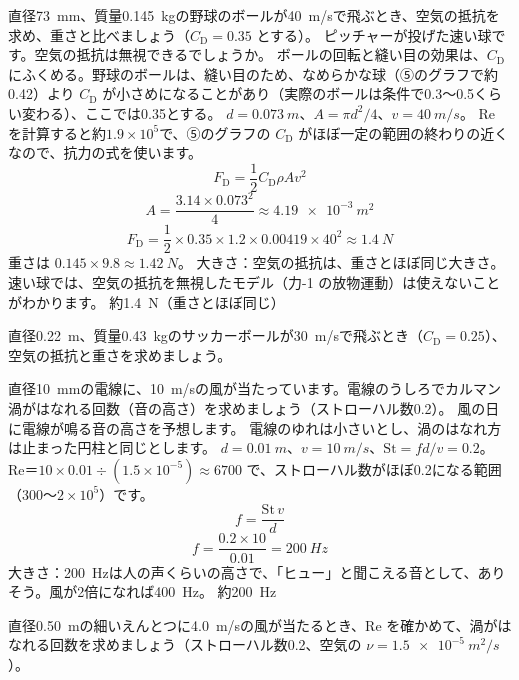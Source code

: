 \begin{phreidai}[野球のボールにはたらく空気の抵抗]\label{ph:力-15:ex7}
直径\qty{73}{mm}、質量\qty{0.145}{kg}の野球のボールが\qty{40}{m/s}で飛ぶとき、空気の抵抗を求め、重さと比べましょう（$C_{\mathrm D}=0.35$ とする）。
\phbamen
ピッチャーが投げた速い球です。空気の抵抗は無視できるでしょうか。
\phmushi
ボールの回転と縫い目の効果は、$C_{\mathrm D}$ にふくめる。野球のボールは、縫い目のため、なめらかな球（⑤のグラフで約0.42）より $C_{\mathrm D}$ が小さめになることがあり（実際のボールは条件で0.3〜0.5くらい変わる）、ここでは0.35とする。
\phzu
$d=\qty{0.073}{m}$、$A=\pi d^2/4$、$v=\qty{40}{m/s}$。
\phriyu
Re を計算すると約$1.9\times10^5$で、⑤のグラフの $C_{\mathrm D}$ がほぼ一定の範囲の終わりの近くなので、抗力の式を使います。
\phtateru
\[F_{\mathrm D}=\frac{1}{2}C_{\mathrm D}\rho Av^2\]
\phtoku
\[A=\frac{3.14\times0.073^2}{4}\approx\qty{4.19e-3}{m^2}\]
\[F_{\mathrm D}=\frac12\times0.35\times1.2\times0.00419\times40^2\approx\qty{1.4}{N}\]
重さは $0.145\times9.8\approx\qty{1.42}{N}$。
\phtashikame
大きさ：空気の抵抗は、重さとほぼ同じ大きさ。速い球では、空気の抵抗を無視したモデル（力-1 の放物運動）は使えないことがわかります。
\kotae 約\qty{1.4}{N}（重さとほぼ同じ）
\end{phreidai}
\begin{jibun}
直径\qty{0.22}{m}、質量\qty{0.43}{kg}のサッカーボールが\qty{30}{m/s}で飛ぶとき（$C_{\mathrm D}=0.25$）、空気の抵抗と重さを求めましょう。
\end{jibun}

\begin{phreidai}[電線が鳴る音の高さ]\label{ph:力-15:ex8}
直径\qty{10}{mm}の電線に、\qty{10}{m/s}の風が当たっています。電線のうしろでカルマン渦がはなれる回数（音の高さ）を求めましょう（ストローハル数0.2）。
\phbamen
風の日に電線が鳴る音の高さを予想します。
\phmushi
電線のゆれは小さいとし、渦のはなれ方は止まった円柱と同じとします。
\phzu
$d=\qty{0.01}{m}$、$v=\qty{10}{m/s}$、$\mathrm{St}=fd/v=0.2$。
\phriyu
Re＝$10\times0.01\div (1.5\times10^{-5})\approx\num{6700}$ で、ストローハル数がほぼ0.2になる範囲（300〜$2\times10^5$）です。
\phtateru
\[f=\frac{\mathrm{St}\,v}{d}\]
\phtoku
\[f=\frac{0.2\times10}{0.01}=\qty{200}{Hz}\]
\phtashikame
大きさ：\qty{200}{Hz}は人の声くらいの高さで、「ヒュー」と聞こえる音として、ありそう。風が2倍になれば\qty{400}{Hz}。
\kotae 約\qty{200}{Hz}
\end{phreidai}
\begin{jibun}
直径\qty{0.50}{m}の細いえんとつに\qty{4.0}{m/s}の風が当たるとき、Re を確かめて、渦がはなれる回数を求めましょう（ストローハル数0.2、空気の $\nu=\qty{1.5e-5}{m^2/s}$）。
\end{jibun}


